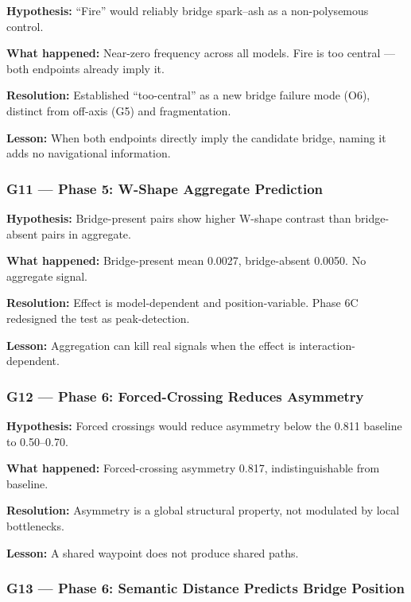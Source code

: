 \textbf{Hypothesis:} ``Fire'' would reliably bridge spark--ash as a non-polysemous control.

\textbf{What happened:} Near-zero frequency across all models. Fire is too central --- both endpoints already imply it.

\textbf{Resolution:} Established ``too-central'' as a new bridge failure mode (O6), distinct from off-axis (G5) and fragmentation.

\textbf{Lesson:} When both endpoints directly imply the candidate bridge, naming it adds no navigational information.

\subsubsection{G11 --- Phase 5: W-Shape Aggregate Prediction}\label{g11-phase-5-w-shape-aggregate-prediction}

\textbf{Hypothesis:} Bridge-present pairs show higher W-shape contrast than bridge-absent pairs in aggregate.

\textbf{What happened:} Bridge-present mean 0.0027, bridge-absent 0.0050. No aggregate signal.

\textbf{Resolution:} Effect is model-dependent and position-variable. Phase 6C redesigned the test as peak-detection.

\textbf{Lesson:} Aggregation can kill real signals when the effect is interaction-dependent.

\subsubsection{G12 --- Phase 6: Forced-Crossing Reduces Asymmetry}\label{g12-phase-6-forced-crossing-reduces-asymmetry}

\textbf{Hypothesis:} Forced crossings would reduce asymmetry below the 0.811 baseline to 0.50--0.70.

\textbf{What happened:} Forced-crossing asymmetry 0.817, indistinguishable from baseline.

\textbf{Resolution:} Asymmetry is a global structural property, not modulated by local bottlenecks.

\textbf{Lesson:} A shared waypoint does not produce shared paths.

\subsubsection{G13 --- Phase 6: Semantic Distance Predicts Bridge Position}\label{g13-phase-6-semantic-distance-predicts-bridge-position}

